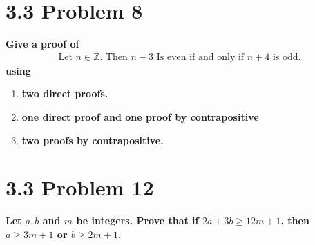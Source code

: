 \documentclass[10pt]{article}
\begin{document}
\section{3.3 Problem 8}
\textbf{Give a proof of
    \begin{align*}
        \text{Let } n \in \mathbb{Z} \text{. Then } n - 3 \text{ Is even if and only if } n + 4 \text{ is odd.}
    \end{align*}
using}

\begin{enumerate}[label=(\alph*)]

    \item \textbf{two direct proofs.}
    \item \textbf{one direct proof and one proof by contrapositive}
    \item \textbf{two proofs by contrapositive.}
    

\end{enumerate}





\section{3.3 Problem 12}
\textbf{Let $a,b$ and $m$ be integers. Prove that if $2a + 3b \geq 12m +1$, then $a \geq 3m + 1$ or $b \geq 2m + 1$.}
\end{document}
